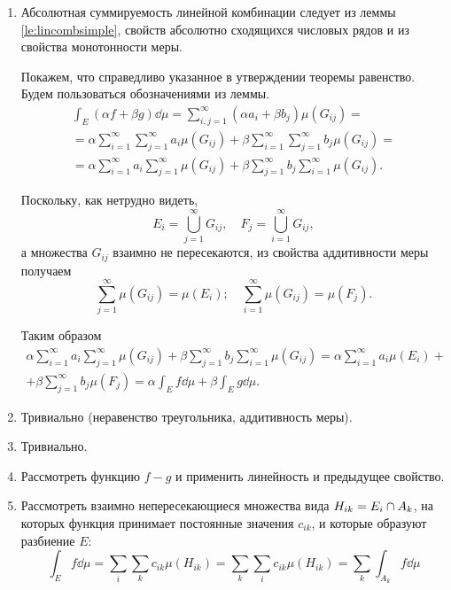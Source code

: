 \begin{proofbreak}
    \begin{enumerate}
        \item Абсолютная суммируемость линейной комбинации следует из
            леммы \ref{le:lincombsimple}, свойств абсолютно сходящихся числовых рядов и из свойства
            монотонности меры.

            Покажем, что справедливо указанное в утверждении теоремы равенство.
            Будем пользоваться обозначениями из леммы.
            \begin{multline*}
                \int_E (\alpha f + \beta g) \dd \mu = \sum_{i,j=1}^\infty (\alpha
                a_i + \beta b_j) \mu (G_{ij}) = \\ = \alpha \sum_{i=1}^\infty
                \sum_{j=1}^\infty a_i \mu (G_{ij}) + \beta \sum_{i=1}^\infty
                \sum_{j=1}^\infty b_j \mu (G_{ij}) = \\ = \alpha \sum_{i=1}^\infty
                a_i \sum_{j=1}^\infty \mu (G_{ij}) + \beta \sum_{j=1}^\infty b_j
                \sum_{i=1}^\infty \mu (G_{ij}).
            \end{multline*}

            Поскольку, как нетрудно видеть, 
            \[ E_i = \bigcup\limits_{j=1}^\infty G_{ij}, \quad 
                F_j = \bigcup\limits_{i=1}^\infty G_{ij},\]
            а множества
            $G_{ij}$ взаимно не пересекаются, из свойства аддитивности меры
            получаем
            \[ \sum_{j=1}^\infty \mu (G_{ij}) = \mu(E_i); \quad
             \sum_{i=1}^\infty \mu (G_{ij}) = \mu(F_j). \]

             Таким образом
             \begin{multline*}
                \alpha \sum_{i=1}^\infty
                a_i \sum_{j=1}^\infty \mu (G_{ij}) + \beta \sum_{j=1}^\infty b_j
                \sum_{i=1}^\infty \mu (G_{ij})=   
                \alpha \sum_{i=1}^\infty
                a_i \mu(E_i) +\\+ \beta \sum_{j=1}^\infty b_j
                 \mu(F_j) = \alpha \int_E f \dd \mu + \beta \int_E g \dd \mu. 
             \end{multline*}

        \item Тривиально (неравенство треугольника, аддитивность меры).
        \item Тривиально.
        \item Рассмотреть функцию $f - g$ и применить линейность и предыдущее
            свойство.
        \item Рассмотреть взаимно непересекающиеся множества вида $H_{ik} = E_i \hm \cap A_k$, 
            на которых функция принимает постоянные значения $c_{ik}$, и которые образуют
            разбиение $E$:
            \[ \int_E f \dd \mu = \sum_i \sum_k c_{ik} \mu(H_{ik}) = \sum_k
            \sum_i c_{ik} \mu(H_{ik}) = \sum_k \int_{A_k} f \dd \mu \]
    \end{enumerate}
\end{proofbreak}

